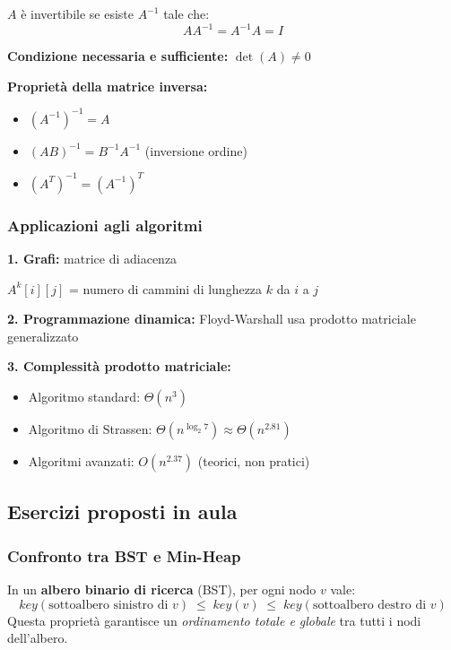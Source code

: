 \begin{definizione}
	$A$ è invertibile se esiste $A^{-1}$ tale che:
	\[
	AA^{-1} = A^{-1}A = I
	\]
	
	\textbf{Condizione necessaria e sufficiente:} $\det(A) \neq 0$
\end{definizione}

\textbf{Proprietà della matrice inversa:}
\begin{itemize}
	\item $(A^{-1})^{-1} = A$
	\item $(AB)^{-1} = B^{-1}A^{-1}$ (inversione ordine)
	\item $(A^T)^{-1} = (A^{-1})^T$
\end{itemize}

\subsubsection{Applicazioni agli algoritmi}

\textbf{1. Grafi:} matrice di adiacenza

$A^k[i][j]$ = numero di cammini di lunghezza $k$ da $i$ a $j$

\textbf{2. Programmazione dinamica:} Floyd-Warshall usa prodotto matriciale generalizzato

\textbf{3. Complessità prodotto matriciale:}
\begin{itemize}
	\item Algoritmo standard: $\Theta(n^3)$
	\item Algoritmo di Strassen: $\Theta(n^{\log_2 7}) \approx \Theta(n^{2.81})$
	\item Algoritmi avanzati: $O(n^{2.37})$ (teorici, non pratici)
\end{itemize}

\subsection{Esercizi proposti in aula}
	\subsubsection{Confronto tra BST e Min-Heap}
	
	\begin{definizione}
		In un \textbf{albero binario di ricerca} (BST), per ogni nodo $v$ vale:
		\[
		key(\text{sottoalbero sinistro di } v) \;\leq\; key(v) \;\leq\; key(\text{sottoalbero destro di } v)
		\]
		Questa proprietà garantisce un \emph{ordinamento totale e globale} tra tutti i nodi dell'albero.
	\end{definizione}
	

